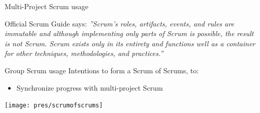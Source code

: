 \begin{frame}{Multi-Project Scrum usage}
  \begin{block}{Official Scrum Guide says:}
  \textit{''Scrum’s roles, artifacts, events, and rules are immutable and although implementing only parts of Scrum is possible, the result is not Scrum. 
  Scrum exists only in its entirety and functions well as a container for other techniques, methodologies, and practices.''}
  \end{block}
\end{frame}

\begin{frame}{Group Scrum usage}
	Intentions to form a Scrum of Scrums, to:
	\begin{itemize}
		\item Synchronize progress with multi-project Scrum
	\end{itemize}
	\begin{center}
	\texttt{[image: pres/scrumofscrums]}
	\end{center}
\end{frame}

